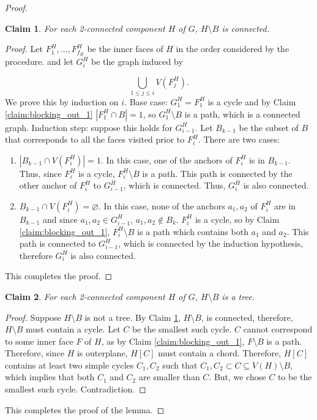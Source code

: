 \documentclass{patmorin}
\let\emptyset\varnothing
\newtheorem{claim}{Claim}[theorem]
\begin{document}
\begin{proof}
 \begin{claim}
  For each 2-connected component $H$ of $G$, $H\setminus B$ is connected.
  \label{claim:blocking_out_2}
 \end{claim}
 
 \begin{proof}
 Let $F_1^H,\ldots,F_{f_H}^H$ be the inner faces of $H$ in the order
 considered by the procedure. and let $G_i^H$ be the graph induced by  

 \begin{equation}
  \bigcup_{1 \leq j \leq i}V(F_j^H).
 \end{equation}
 We prove this by induction on $i$. Base case: $G_1^H=F_1^H$ is a cycle and by Claim \ref{claim:blocking_out_1} $|F_1^H \cap B|=1$, so $G_1^H\setminus B$ is a path, which is a connected graph. Induction step: suppose this holds for $G_{i-1}^H$. Let $B_{k-1}$ be the subset of $B$ that corresponds to all the faces visited prior to $F_i^H$. There are two cases:
 
 \begin{enumerate}
  \item $|B_{k-1} \cap V(F_i^H)|=1$. In this case, one of the anchors
  of $F_i^H$ is in $B_{k-1}$. Thus, since $F_i^H$ is a cycle, $F_i^H
  \setminus B$ is a path. This path is connected by the other anchor
  of $F_i^H$ to $G_{i-1}^H$, which is connected. Thus, $G_i^H$ is also
  connected.
 

  \item $B_{k-1} \cap V(F_i^H) = \emptyset$. In this case, none of the
  anchors $a_1,a_2$ of $F_i^H$ are in $B_{k-1}$ and since $a_1,a_2 \in
  G_{i-1}^H$, $a_1,a_2 \notin B_k$. $F_i^H$ is a cycle, so by Claim
  \ref{claim:blocking_out_1}, $F_i^H \setminus B$ is a path which
  contains both $a_1$ and $a_2$. This path is connected to $G_{i-1}^H$,
  which is connected by the induction hypothesis, therefore $G_i^H$
  is also connected.

 \end{enumerate}
 This completes the proof.
 \end{proof}
 
 \begin{claim}
  For each 2-connected component $H$ of $G$, $H\setminus B$ is a tree.
  \label{claim:blocking_out_3}
 \end{claim}
 
 \begin{proof}
 Suppose $H\setminus B$ is not a tree. By Claim \ref{claim:blocking_out_2}, $H\setminus B$, is connected, therefore, $H\setminus B$ must contain a cycle. Let $C$ be the smallest such cycle. $C$ cannot correspond to some inner face $F$ of $H$, as by Claim \ref{claim:blocking_out_1}, $F \setminus B$ is a path. Therefore, since $H$ is outerplane, $H[C]$ must contain a chord. Therefore, $H[C]$ contains at least two simple cycles $C_1,C_2$ such that $C_1,C_2 \subset C \subseteq V(H) \setminus B$, which implies that both $C_1$ and $C_2$ are smaller than $C$. But, we chose $C$ to be the smallest such cycle. Contradiction. 
 \end{proof}
 
 \noindent This completes the proof of the lemma. 
\end{proof}
\end{document}
